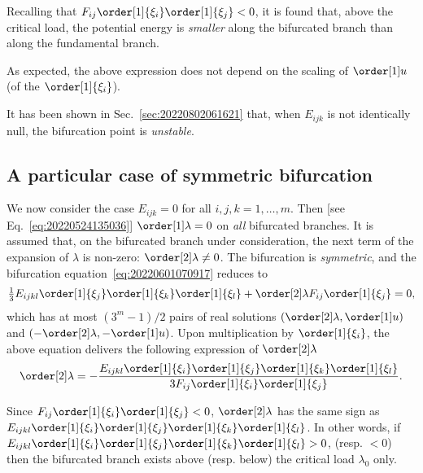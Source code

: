 Recalling that $F_{i j} \order[1]{\xi_i} \order[1]{\xi_j} < 0$, it is found that, above the critical load, the potential
energy is \emph{smaller} along the bifurcated branch than along the fundamental branch.

\begin{remark}
  As expected, the above expression does not depend on the scaling of $\order[1]u$ (of the $\order[1]{\xi_i}$).
\end{remark}
\begin{remark}
  It has been shown in Sec.~\ref{sec:20220802061621} that, when $E_{ijk}$ is not identically null, the bifurcation point
  is \emph{unstable}.
\end{remark}

\subsection{A particular case of symmetric bifurcation}

We now consider the case $E_{ijk}=0$ for all $i, j, k = 1, \ldots, m$. Then [see Eq.~\eqref{eq:20220524135036}]
$\order[1]\lambda = 0$ on \emph{all} bifurcated branches. It is assumed that, on the bifurcated branch under
consideration, the next term of the expansion of $\lambda$ is non-zero: $\order[2]\lambda \neq 0$. The bifurcation is
\emph{symmetric}, and the bifurcation equation~\eqref{eq:20220601070917} reduces to
\begin{equation}
  \label{eq:20220801092222}
  \tfrac{1}{3} E_{ijkl} \order[1]{\xi_j} \order[1]{\xi_k} \order[1]{\xi_l}  + \order[2]\lambda F_{ij} \order[1]{\xi_j} = 0,
\end{equation}
which has at most $(3^m - 1) / 2$ pairs of real solutions
$(\order[2]\lambda, \order[1]u)$ and $(- \order[2]\lambda, - \order[1]u)$. Upon
multiplication by $\order[1]{\xi_i}$, the above equation delivers the following
expression of $\order[2]\lambda$
\begin{equation}
  \label{eq:20220801093236}
  \order[2]\lambda = -\frac{E_{ijkl} \order[1]{\xi_i} \order[1]{\xi_j} \order[1]{\xi_k} \order[1]{\xi_l}}{3 F_{ij} \order[1]{\xi_i} \order[1]{\xi_j}}.
\end{equation}

Since $F_{ij} \order[1]{\xi_i} \order[1]{\xi_j} < 0$, $\order[2]\lambda$ has the same sign as
$E_{ijkl}\order[1]{\xi_i} \order[1]{\xi_j} \order[1]{\xi_k} \order[1]{\xi_l}$. In other words, if
$E_{ijkl}\order[1]{\xi_i} \order[1]{\xi_j} \order[1]{\xi_k} \order[1]{\xi_l} > 0$, (resp. $<0$) then the bifurcated
branch exists above (resp. below) the critical load $\lambda_0$ only.

